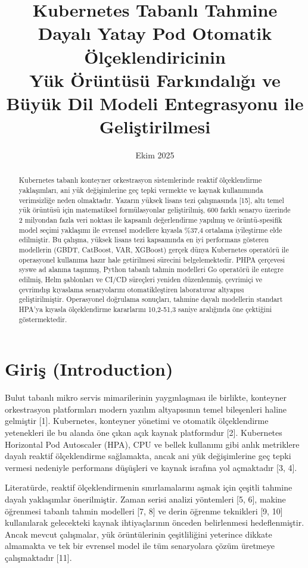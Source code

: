 \documentclass[12pt,a4paper]{article}
\title{Kubernetes Tabanlı Tahmine Dayalı Yatay Pod Otomatik Ölçeklendiricinin\\Yük Örüntüsü Farkındalığı ve Büyük Dil Modeli Entegrasyonu ile Geliştirilmesi}
\author{}
\date{Ekim 2025}
\begin{document}
\maketitle

\begin{abstract}
Kubernetes tabanlı konteyner orkestrasyon sistemlerinde reaktif ölçeklendirme yaklaşımları, ani yük değişimlerine geç tepki vermekte ve kaynak kullanımında verimsizliğe neden olmaktadır. Yazarın yüksek lisans tezi çalışmasında [15], altı temel yük örüntüsü için matematiksel formülasyonlar geliştirilmiş, 600 farklı senaryo üzerinde 2 milyondan fazla veri noktası ile kapsamlı değerlendirme yapılmış ve örüntü-spesifik model seçimi yaklaşımı ile evrensel modellere kıyasla \%37,4 ortalama iyileştirme elde edilmiştir. Bu çalışma, yüksek lisans tezi kapsamında en iyi performans gösteren modellerin (GBDT, CatBoost, VAR, XGBoost) gerçek dünya Kubernetes operatörü ile operasyonel kullanıma hazır hale getirilmesi sürecini belgelemektedir. PHPA çerçevesi syswe ad alanına taşınmış, Python tabanlı tahmin modelleri Go operatörü ile entegre edilmiş, Helm şablonları ve CI/CD süreçleri yeniden düzenlenmiş, çevrimiçi ve çevrimdışı kıyaslama senaryolarını otomatikleştiren laboratuvar altyapısı geliştirilmiştir. Operasyonel doğrulama sonuçları, tahmine dayalı modellerin standart HPA'ya kıyasla ölçeklendirme kararlarını 10,2-51,3 saniye aralığında öne çektiğini göstermektedir.
\end{abstract}

\section{Giriş (Introduction)}

Bulut tabanlı mikro servis mimarilerinin yaygınlaşması ile birlikte, konteyner orkestrasyon platformları modern yazılım altyapısının temel bileşenleri haline gelmiştir [1]. Kubernetes, konteyner yönetimi ve otomatik ölçeklendirme yetenekleri ile bu alanda öne çıkan açık kaynak platformdur [2]. Kubernetes Horizontal Pod Autoscaler (HPA), CPU ve bellek kullanımı gibi anlık metriklere dayalı reaktif ölçeklendirme sağlamakta, ancak ani yük değişimlerine geç tepki vermesi nedeniyle performans düşüşleri ve kaynak israfına yol açmaktadır [3, 4].

Literatürde, reaktif ölçeklendirmenin sınırlamalarını aşmak için çeşitli tahmine dayalı yaklaşımlar önerilmiştir. Zaman serisi analizi yöntemleri [5, 6], makine öğrenmesi tabanlı tahmin modelleri [7, 8] ve derin öğrenme teknikleri [9, 10] kullanılarak gelecekteki kaynak ihtiyaçlarının önceden belirlenmesi hedeflenmiştir. Ancak mevcut çalışmalar, yük örüntülerinin çeşitliliğini yeterince dikkate almamakta ve tek bir evrensel model ile tüm senaryolara çözüm üretmeye çalışmaktadır [11].
\end{document}
